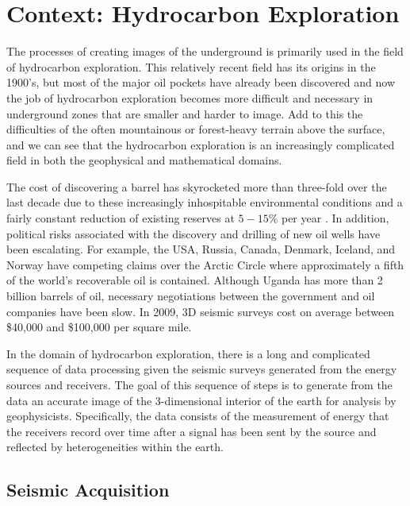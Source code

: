 \newpage
\section{Context: Hydrocarbon Exploration}

The processes of creating images of the underground is primarily used in the field of hydrocarbon exploration. This relatively recent field has its origins in the 1900's, but most of the major oil pockets have already been discovered and now the job of hydrocarbon exploration becomes more difficult and necessary in underground zones that are smaller and harder to image. Add to this the difficulties of the often mountainous or forest-heavy terrain above the surface, and we can see that the hydrocarbon exploration is an increasingly complicated field in both the geophysical and mathematical domains. 

The cost of discovering a barrel has skyrocketed more than three-fold over the last decade due to these increasingly inhospitable environmental conditions and a fairly constant reduction of existing reserves at $5-15\%$ per year \cite{hydrocarbonExplorationCosts}. In addition, political risks associated with the discovery and drilling of new oil wells have been escalating. For example, the USA, Russia, Canada, Denmark, Iceland, and Norway have competing claims over the Arctic Circle where approximately a fifth of the world's recoverable oil is contained. Although Uganda has more than 2 billion barrels of oil, necessary negotiations between the government and oil companies have been slow. In 2009, 3D seismic surveys cost on average between \$40,000 and \$100,000 per square mile. \cite{hydrocarbonExplorationCosts}

In the domain of hydrocarbon exploration, there is a long and complicated sequence of data processing given the seismic surveys generated from the energy sources and receivers. The goal of this sequence of steps is to generate from the data an accurate image of the 3-dimensional interior of the earth for analysis by geophysicists. Specifically, the data consists of the measurement of energy that the receivers record over time after a signal has been sent by the source and reflected by heterogeneities within the earth.

\subsection{Seismic Acquisition}


